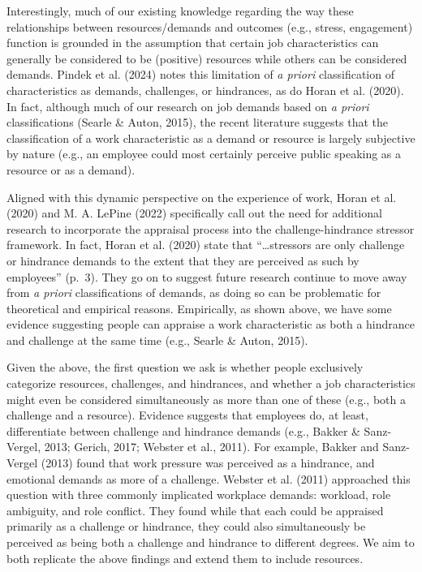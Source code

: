 \documentclass[
  man]{apa7}
\begin{document}
Interestingly, much of our existing knowledge regarding the way these relationships between resources/demands and outcomes (e.g., stress, engagement) function is grounded in the assumption that certain job characteristics can generally be considered to be (positive) resources while others can be considered demands. Pindek et al. (2024) notes this limitation of \emph{a priori} classification of characteristics as demands, challenges, or hindrances, as do Horan et al. (2020). In fact, although much of our research on job demands based on \emph{a priori} classifications (Searle \& Auton, 2015), the recent literature suggests that the classification of a work characteristic as a demand or resource is largely subjective by nature (e.g., an employee could most certainly perceive public speaking as a resource or as a demand).

Aligned with this dynamic perspective on the experience of work, Horan et al. (2020) and M. A. LePine (2022) specifically call out the need for additional research to incorporate the appraisal process into the challenge-hindrance stressor framework. In fact, Horan et al. (2020) state that ``\ldots stressors are only challenge or hindrance demands to the extent that they are perceived as such by employees'' (p.~3). They go on to suggest future research continue to move away from \emph{a priori} classifications of demands, as doing so can be problematic for theoretical and empirical reasons. Empirically, as shown above, we have some evidence suggesting people can appraise a work characteristic as both a hindrance and challenge at the same time (e.g., Searle \& Auton, 2015).

Given the above, the first question we ask is whether people exclusively categorize resources, challenges, and hindrances, and whether a job characteristics might even be considered simultaneously as more than one of these (e.g., both a challenge and a resource). Evidence suggests that employees do, at least, differentiate between challenge and hindrance demands (e.g., Bakker \& Sanz-Vergel, 2013; Gerich, 2017; Webster et al., 2011). For example, Bakker and Sanz-Vergel (2013) found that work pressure was perceived as a hindrance, and emotional demands as more of a challenge. Webster et al. (2011) approached this question with three commonly implicated workplace demands: workload, role ambiguity, and role conflict. They found while that each could be appraised primarily as a challenge or hindrance, they could also simultaneously be perceived as being both a challenge and hindrance to different degrees. We aim to both replicate the above findings and extend them to include resources.
\end{document}
